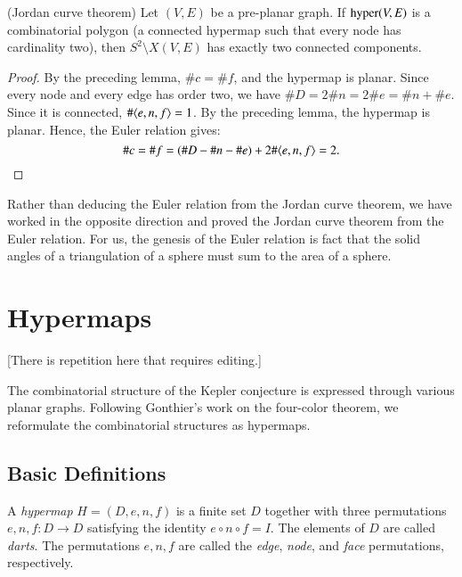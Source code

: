 \begin{lemma*} (Jordan curve theorem)  Let $(V,E)$ be a pre-planar
graph.   If ${\operatorname{hyper}}(V,E)$ is a combinatorial polygon (a
connected hypermap such that every node has cardinality two), then
$S^2\setminus X(V,E)$ has exactly two connected components.
\end{lemma*}

\begin{proof} By the preceding lemma, $\# c = \#f$, and the
hypermap is planar.  Since every node and every edge has order two,
we have $\#D = 2\#n = 2\# e = \#n +\#e$.  Since it is connected,
$\#\langle e,n,f\rangle = 1$.  By the preceding lemma, the hypermap is
planar. Hence, the Euler relation gives:
    $$
    \#c = \#f = (\#D - \#n - \#e) + 2\#\langle e,n,f\rangle =2.
    $$
\end{proof}

\begin{remark*}   Rather than deducing the Euler relation from the Jordan
curve theorem, we have worked in the opposite direction and proved
the Jordan curve theorem from the Euler relation.  For us, the
genesis of the Euler relation is fact that the solid angles of a
triangulation of a sphere must sum to the area of a sphere.
\end{remark*}




\section{Hypermaps}

[There is repetition here that requires editing.]

The combinatorial structure of the Kepler conjecture is expressed
through various planar graphs.  Following Gonthier's work on the
four-color theorem, we reformulate the combinatorial structures as
hypermaps.

\subsection{Basic Definitions}

\begin{definition}  A {\it hypermap} $H=(D,e,n,f)$ is a finite set $D$
together with three permutations $e,n,f:D\to D$ satisfying the
identity $e\circ n\circ f = I$.  The elements of $D$ are called
{\it darts}.  The permutations $e,n,f$ are called the {\it edge},
{\it node}, and {\it face} permutations, respectively.
\end{definition}

